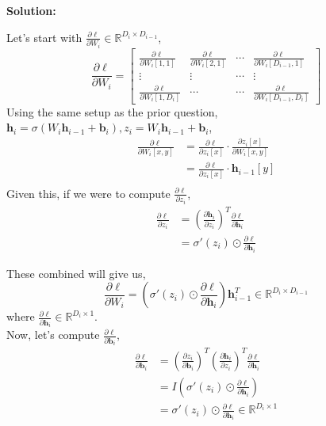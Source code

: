 \documentclass{article}
\newenvironment{solution}
  {\par\noindent\textbf{Solution:}\par}
  {\par}
\begin{document}
\subsection{}
\begin{solution}
  Let's start with $\frac{\partial \ell}{\partial W_i} \in \mathbb{R}^{D_{i} \times D_{i-1}}$,
  \[
    \frac{\partial \ell}{\partial W_i} = \begin{bmatrix} 
      \frac{\partial \ell}{\partial W_i[1,1]} & \frac{\partial \ell}{\partial W_i[2,1]} & \cdots & \frac{\partial \ell}{\partial W_i[D_{i-1},1]} \\ 
      \vdots & \vdots & \cdots & \vdots \\ 
      \frac{\partial \ell}{\partial W_i[1,D_i]} & \cdots & \cdots & \frac{\partial \ell}{\partial W_i[D_{i-1},D_i]}
      
    \end{bmatrix}
  \]
  Using the same setup as the prior question, $\textbf{h}_i = \sigma(W_i\textbf{h}_{i-1} + \textbf{b}_i), z_i = W_i\textbf{h}_{i-1} + \textbf{b}_i$,
  \[
  \begin{aligned}
    \frac{\partial \ell}{\partial W_i[x,y]} &= \frac{\partial \ell}{\partial z_i[x]} \cdot \frac{\partial z_i[x]}{\partial W_i[x,y]} \\ 
                                            &= \frac{\partial \ell}{\partial z_i[x]} \cdot \textbf{h}_{i-1}[y] \\ 
  \end{aligned}
  \]
  Given this, if we were to compute $\frac{\partial \ell}{\partial z_i}$,
  \[
    \begin{aligned}
      \frac{\partial \ell}{\partial z_i} &= \left( \frac{\partial \textbf{h}_i}{\partial z_i} \right)^T \frac{\partial \ell}{\partial \textbf{h}_i} \\ 
                                         &= \sigma'(z_i) \odot \frac{\partial \ell}{\partial \textbf{h}_i}  
    \end{aligned}
  \]

  These combined will give us,
  $$ \frac{\partial \ell}{\partial W_i} = \left( \sigma'(z_i) \odot \frac{\partial \ell}{\partial \textbf{h}_i} \right) \textbf{h}_{i-1}^T \in \mathbb{R}^{D_i \times D_{i-1}} $$
  where $\frac{\partial \ell}{\partial \textbf{h}_i} \in \mathbb{R}^{D_i \times 1}$. \\ 
  Now, let's compute $\frac{\partial \ell}{\partial \textbf{b}_i}$, 
  \[
    \begin{aligned}
      \frac{\partial \ell}{\partial \textbf{b}_i} &= \left(\frac{\partial z_i}{\partial \textbf{b}_i} \right)^T \left( \frac{\partial \textbf{h}_i}{\partial z_i}\right)^T \frac{\partial \ell}{\partial \textbf{h}_i}  \\ 
                                                  &= I \left( \sigma'(z_i) \odot \frac{\partial \ell}{\partial \textbf{h}_i} \right) \\ 
                                                  &= \sigma'(z_i) \odot \frac{\partial \ell}{\partial \textbf{h}_i} \in \mathbb{R}^{D_i \times 1 }
    \end{aligned}
    \]
\end{solution}
\end{document}
